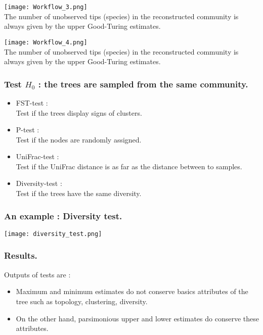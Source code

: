 \documentclass[10pt]{beamer}
\begin{document}
\begin{frame}
	\begin{center}
       \texttt{[image: Workflow\_3.png]}\\
              The number of unobserved tips (species) in the reconstructed community is always given by the upper Good-Turing estimates.
	\end{center}
\end{frame}

\begin{frame}
	\begin{center}
       \texttt{[image: Workflow\_4.png]}\\
              The number of unobserved tips (species) in the reconstructed community is always given by the upper Good-Turing estimates.
	\end{center}
\end{frame}


\begin{frame}
\frametitle{Test $H_0$ : the trees are sampled from the same community.}
\begin{itemize}
\item FST-test : \\
	Test if the trees display signs of clusters.
\item P-test : \\
	Test if the nodes are randomly assigned.
\item UniFrac-test : \\
	Test if the UniFrac distance is as far as the distance between to samples.
\item Diversity-test : \\
	Test if the trees have the same diversity.
\end{itemize}

\end{frame}


\begin{frame}

\frametitle{An example : Diversity test.}
	\begin{center}

       \texttt{[image: diversity\_test.png]}
	\end{center}
\end{frame}

\begin{frame}

\frametitle{Results.}
Outputs of tests are : \\

	\begin{itemize}
	\item<1> Maximum and minimum estimates do not conserve basics attributes of the tree such as topology, clustering, diversity.
	\item<1> On the other hand, parsimonious upper and lower estimates do conserve these attributes.
	\end{itemize}

\end{frame}
\end{document}
